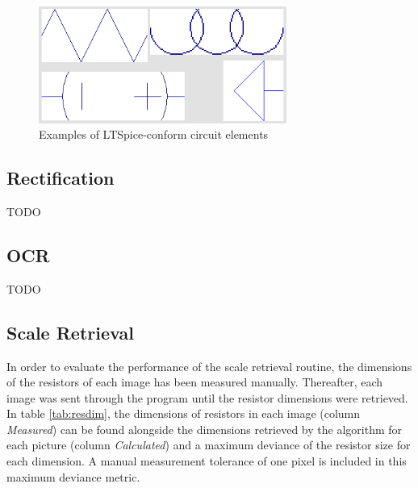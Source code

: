 \documentclass[10pt,twocolumn,letterpaper]{article}
\begin{document}
\begin{figure}[!ht]
\includegraphics[width = 3.2in]{img/elements.png}
\caption{Examples of LTSpice-conform circuit elements}
\label{fig:c4}
\end{figure}

\subsection{Rectification}

TODO

\subsection{OCR}

TODO

\subsection{Scale Retrieval}

In order to evaluate the performance of the scale retrieval routine, the dimensions of the resistors of each image has been measured manually. Thereafter, each image was sent through the program until the resistor dimensions were retrieved. In table \ref{tab:resdim}, the dimensions of resistors in each image (column \textit{Measured}) can be found alongside the dimensions retrieved by the algorithm for each picture (column \textit{Calculated}) and a maximum deviance of the resistor size for each dimension. A manual measurement tolerance of one pixel is included in this maximum deviance metric.
\par
\end{document}

